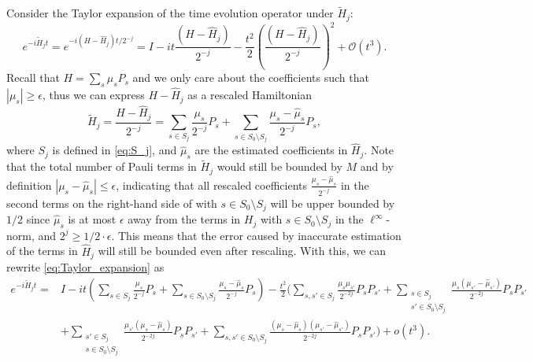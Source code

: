 \documentclass[twocolumn,superscriptaddress,aps,showpacs,amsmath,amstex,amssymb,citeautoscript,floatfix,pra,preprintnumbers]{revtex4-2}
\theoremstyle{plain}
\theoremstyle{plain}
\theoremstyle{plain}
\theoremstyle{plain}
\theoremstyle{plain}
\theoremstyle{plain}
\begin{document}
\begin{appendix}
Consider the Taylor expansion of the time evolution operator under $\tilde{H}_j$:
\begin{equation}
\label{eq:Taylor_expansion}
    e^{-i\tilde{H}_jt} = e^{-i(H-\hat{H}_j)t/2^{-j}} = I - it\frac{(H-\hat{H}_j)}{2^{-j}} - \frac{t^2}{2}\left(\frac{(H-\hat{H}_j)}{2^{-j}}\right)^2 + \mathcal{O}(t^3).
\end{equation}
Recall that $H = \sum_s\mu_sP_s$ and we only care about the coefficients such that $|\mu_s|\geq\epsilon$, thus we can express $H-\hat{H}_j$ as a rescaled Hamiltonian
\begin{equation}
\label{eq:tilde_H_j}
    \tilde{H}_j = \frac{H-\hat{H}_j}{2^{-j}} = \sum_{s\in S_j}\frac{\mu_s}{2^{-j}}P_s + \sum_{s\in S_0\setminus S_j}\frac{\mu_s-\hat{\mu}_s}{2^{-j}}P_s,
\end{equation}
where $S_j$ is defined in \eqref{eq:S_j}, and $\hat{\mu}_s$ are the estimated coefficients in $\hat{H}_j$. Note that the total number of Pauli terms in $\tilde{H}_j$ would still be bounded by $M$ and by definition $|\mu_s-\hat{\mu}_s|\leq\epsilon$, indicating that all rescaled coefficients $\frac{\mu_s-\hat{\mu}_s}{2^{-j}}$ in the second terms on the right-hand side of  with $s\in S_0\setminus S_j$ will be upper bounded by $1/2$ since $\hat{\mu}_s$ is at most $\epsilon$ away from the terms in $H_j$ with $s\in S_0\setminus S_j$ in the $\ell^\infty$-norm, and $2^j\geq 1/2\cdot\epsilon$. This means that the error caused by inaccurate estimation of the terms in $\hat{H}_j$ will still be bounded even after rescaling. With this, we can rewrite \eqref{eq:Taylor_expansion} as
\begin{equation}
\begin{split}
\label{eq:Taylor_expansion_terms}
    e^{-i\tilde{H}_jt} = &I - it\left(\sum_{s\in S_j}\frac{\mu_s}{2^{-j}}P_s + \sum_{s\in S_0\setminus S_j}\frac{\mu_s-\hat{\mu}_s}{2^{-j}}P_s\right) - \frac{t^2}{2}\Bigg(\sum_{s,s'\in S_j}\frac{\mu_s\mu_{s'}}{2^{-2j}}P_sP_{s'} + \sum_{\substack{s\in S_j\\s'\in S_0\setminus S_j}}\frac{\mu_s(\mu_{s'}-\hat{\mu}_{s'})}{2^{-2j}}P_sP_{s'}\\
    &+ \sum_{\substack{s'\in S_j\\s\in S_0\setminus S_j}}\frac{\mu_{s'}(\mu_s-\hat{\mu}_s)}{2^{-2j}}P_sP_{s'} + \sum_{s,s'\in S_0\setminus S_j}\frac{(\mu_s-\hat{\mu}_s)(\mu_{s'}-\hat{\mu}_{s'})}{2^{-2j}}P_sP_{s'}\Bigg) + o(t^3).
\end{split}
\end{equation}



\end{appendix}
\end{document}
